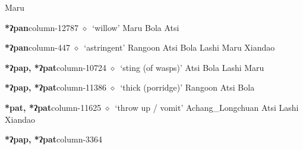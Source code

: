          Maru 
  \item {\footnotesize \textbf{*ʔpan}}{\tiny column-12787}
         $\diamond$~`willow'
         Maru 
\hspace{1ex}
         Bola 
\hspace{1ex}
         Atsi 
  \item {\footnotesize \textbf{*ʔpan}}{\tiny column-447}
         $\diamond$~`astringent'
         Rangoon 
\hspace{1ex}
         Atsi 
\hspace{1ex}
         Bola 
\hspace{1ex}
         Lashi 
\hspace{1ex}
         Maru 
\hspace{1ex}
         Xiandao 
  \item {\footnotesize \textbf{*ʔpap, *ʔpat}}{\tiny column-10724}
         $\diamond$~`sting (of wasps)'
         Atsi 
\hspace{1ex}
         Bola 
\hspace{1ex}
         Lashi 
\hspace{1ex}
         Maru 
  \item {\footnotesize \textbf{*ʔpap, *ʔpat}}{\tiny column-11386}
         $\diamond$~`thick (porridge)'
         Rangoon 
\hspace{1ex}
         Atsi 
\hspace{1ex}
         Bola 
  \item {\footnotesize \textbf{*pat, *ʔpat}}{\tiny column-11625}
         $\diamond$~`throw up / vomit'
         Achang\_Longchuan 
\hspace{1ex}
         Atsi 
\hspace{1ex}
         Lashi 
\hspace{1ex}
         Xiandao 
  \item {\footnotesize \textbf{*ʔpap, *ʔpat}}{\tiny column-3364}
